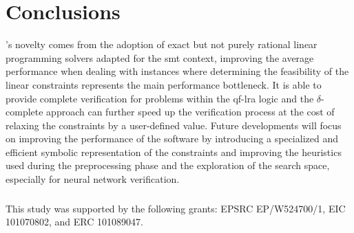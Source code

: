 \documentclass[runningheads]{llncs}
\begin{document}
\section{Conclusions}

\dlinear's novelty comes from the adoption of exact but not purely rational linear programming solvers adapted for the \gls{smt} context, improving the average performance when dealing with instances where determining the feasibility of the linear constraints represents the main performance bottleneck.
It is able to provide complete verification for problems within the \gls{qf-lra} logic and the $\delta$-complete approach can further speed up the verification process at the cost of relaxing the constraints by a user-defined value.
Future developments will focus on improving the performance of the software by introducing a specialized and efficient symbolic representation of the constraints and improving the heuristics used during the preprocessing phase and the exploration of the search space, especially for neural network verification.


\begin{credits}
    \subsubsection{\ackname} This study was supported by the following grants: EPSRC EP/W524700/1, EIC 101070802, and ERC 101089047.
\end{credits}




\end{document}
